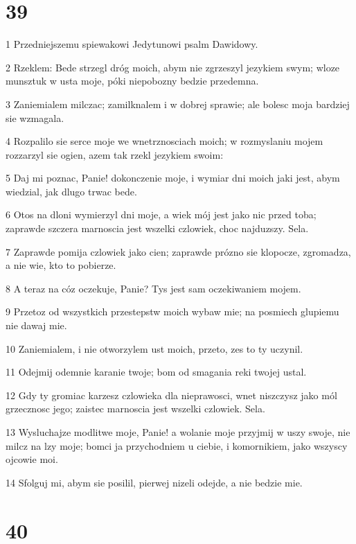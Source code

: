 \chapter{39}

\par 1 Przedniejszemu spiewakowi Jedytunowi psalm Dawidowy.
\par 2 Rzeklem: Bede strzegl dróg moich, abym nie zgrzeszyl jezykiem swym; wloze munsztuk w usta moje, póki niepobozny bedzie przedemna.
\par 3 Zaniemialem milczac; zamilknalem i w dobrej sprawie; ale bolesc moja bardziej sie wzmagala.
\par 4 Rozpalilo sie serce moje we wnetrznosciach moich; w rozmyslaniu mojem rozzarzyl sie ogien, azem tak rzekl jezykiem swoim:
\par 5 Daj mi poznac, Panie! dokonczenie moje, i wymiar dni moich jaki jest, abym wiedzial, jak dlugo trwac bede.
\par 6 Otos na dloni wymierzyl dni moje, a wiek mój jest jako nic przed toba; zaprawde szczera marnoscia jest wszelki czlowiek, choc najduzszy. Sela.
\par 7 Zaprawde pomija czlowiek jako cien; zaprawde prózno sie klopocze, zgromadza, a nie wie, kto to pobierze.
\par 8 A teraz na cóz oczekuje, Panie? Tys jest sam oczekiwaniem mojem.
\par 9 Przetoz od wszystkich przestepstw moich wybaw mie; na posmiech glupiemu nie dawaj mie.
\par 10 Zaniemialem, i nie otworzylem ust moich, przeto, zes to ty uczynil.
\par 11 Odejmij odemnie karanie twoje; bom od smagania reki twojej ustal.
\par 12 Gdy ty gromiac karzesz czlowieka dla nieprawosci, wnet niszczysz jako mól grzecznosc jego; zaistec marnoscia jest wszelki czlowiek. Sela.
\par 13 Wysluchajze modlitwe moje, Panie! a wolanie moje przyjmij w uszy swoje, nie milcz na lzy moje; bomci ja przychodniem u ciebie, i komornikiem, jako wszyscy ojcowie moi.
\par 14 Sfolguj mi, abym sie posilil, pierwej nizeli odejde, a nie bedzie mie.

\chapter{40}

